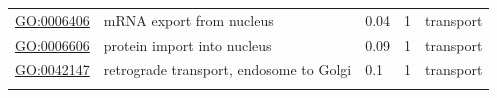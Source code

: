 \documentclass[
]{article}
\begin{document}
\begin{longtable}[]{@{}lllll@{}}
\begin{minipage}[t]{0.17\columnwidth}\raggedright
\url{GO:0006406}\strut
\end{minipage} & \begin{minipage}[t]{0.17\columnwidth}\raggedright
mRNA export from nucleus\strut
\end{minipage} & \begin{minipage}[t]{0.17\columnwidth}\raggedright
0.04\strut
\end{minipage} & \begin{minipage}[t]{0.17\columnwidth}\raggedright
1\strut
\end{minipage} & \begin{minipage}[t]{0.17\columnwidth}\raggedright
transport\strut
\end{minipage}\tabularnewline
\begin{minipage}[t]{0.17\columnwidth}\raggedright
\url{GO:0006606}\strut
\end{minipage} & \begin{minipage}[t]{0.17\columnwidth}\raggedright
protein import into nucleus\strut
\end{minipage} & \begin{minipage}[t]{0.17\columnwidth}\raggedright
0.09\strut
\end{minipage} & \begin{minipage}[t]{0.17\columnwidth}\raggedright
1\strut
\end{minipage} & \begin{minipage}[t]{0.17\columnwidth}\raggedright
transport\strut
\end{minipage}\tabularnewline
\begin{minipage}[t]{0.17\columnwidth}\raggedright
\url{GO:0042147}\strut
\end{minipage} & \begin{minipage}[t]{0.17\columnwidth}\raggedright
retrograde transport, endosome to Golgi\strut
\end{minipage} & \begin{minipage}[t]{0.17\columnwidth}\raggedright
0.1\strut
\end{minipage} & \begin{minipage}[t]{0.17\columnwidth}\raggedright
1\strut
\end{minipage} & \begin{minipage}[t]{0.17\columnwidth}\raggedright
transport\strut
\end{minipage}\tabularnewline
\begin{minipage}[t]{0.17\columnwidth}\raggedright

\end{minipage}
\end{longtable}
\end{document}
